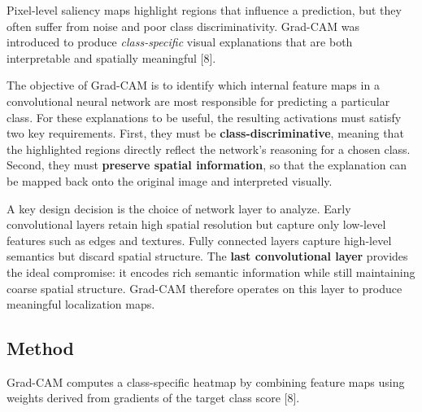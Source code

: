 \documentclass{article}
\renewcommand{\cite}[1]{[#1]}
\begin{document}
Pixel-level saliency maps highlight regions that influence a prediction, but
they often suffer from noise and poor class discriminativity. Grad-CAM was introduced to produce \emph{class-specific} visual explanations that are both interpretable and spatially meaningful \cite{8}.

The objective of Grad-CAM is to identify which internal feature maps in a
convolutional neural network are most responsible for predicting a particular
class. For these explanations to be useful, the resulting activations must
satisfy two key requirements. First, they must be \textbf{class-discriminative},
meaning that the highlighted regions directly reflect the network’s reasoning
for a chosen class. Second, they must \textbf{preserve spatial information}, so
that the explanation can be mapped back onto the original image and interpreted
visually.

A key design decision is the choice of network layer to analyze. Early
convolutional layers retain high spatial resolution but capture only low-level
features such as edges and textures. Fully connected layers capture high-level
semantics but discard spatial structure. The \textbf{last convolutional layer}
provides the ideal compromise: it encodes rich semantic information while still
maintaining coarse spatial structure. Grad-CAM therefore operates on this layer
to produce meaningful localization maps.

\subsection{Method}

Grad-CAM computes a class-specific heatmap by combining feature maps using weights derived from gradients of the target class score \cite{8}.
\end{document}
